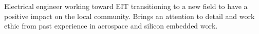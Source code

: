 

\begin{cvparagraph}

Electrical engineer working toward EIT transitioning to a new field to have a positive impact on the local community. 
Brings an attention to detail and work ethic from past experience in aerospace and silicon embedded work.

\end{cvparagraph}
